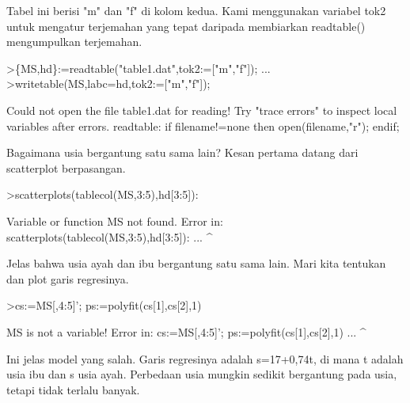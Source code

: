 \documentclass{article}
\begin{document}
\begin{eulernotebook}
\begin{eulercomment}
\begin{eulercomment}
\begin{eulercomment}
Tabel ini berisi "m" dan "f" di kolom kedua. Kami menggunakan variabel
tok2 untuk mengatur terjemahan yang tepat daripada membiarkan
readtable() mengumpulkan terjemahan.
\end{eulercomment}
\begin{eulerprompt}
>\{MS,hd\}:=readtable("table1.dat",tok2:=["m","f"]);  ...
>writetable(MS,labc=hd,tok2:=["m","f"]);
\end{eulerprompt}
\begin{euleroutput}
  Could not open the file
  table1.dat
  for reading!
  Try "trace errors" to inspect local variables after errors.
  readtable:
      if filename!=none then open(filename,"r"); endif;
\end{euleroutput}
\begin{eulercomment}
Bagaimana usia bergantung satu sama lain? Kesan pertama datang dari
scatterplot berpasangan.
\end{eulercomment}
\begin{eulerprompt}
>scatterplots(tablecol(MS,3:5),hd[3:5]):
\end{eulerprompt}
\begin{euleroutput}
  Variable or function MS not found.
  Error in:
  scatterplots(tablecol(MS,3:5),hd[3:5]): ...
                          ^
\end{euleroutput}
\begin{eulercomment}
Jelas bahwa usia ayah dan ibu bergantung satu sama lain. Mari kita
tentukan dan plot garis regresinya.
\end{eulercomment}
\begin{eulerprompt}
>cs:=MS[,4:5]'; ps:=polyfit(cs[1],cs[2],1)
\end{eulerprompt}
\begin{euleroutput}
  MS is not a variable!
  Error in:
  cs:=MS[,4:5]'; ps:=polyfit(cs[1],cs[2],1) ...
              ^
\end{euleroutput}
\begin{eulercomment}
Ini jelas model yang salah. Garis regresinya adalah s=17+0,74t, di
mana t adalah usia ibu dan s usia ayah. Perbedaan usia mungkin sedikit
bergantung pada usia, tetapi tidak terlalu banyak.


\end{eulercomment}
\end{eulercomment}
\end{eulercomment}
\end{eulernotebook}
\end{document}

